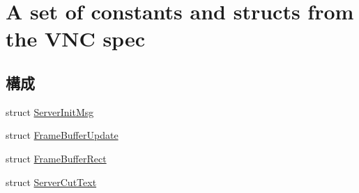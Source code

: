 \hypertarget{group__VncConstants}{
\section{A set of constants and structs from the VNC spec}
\label{group__VncConstants}
}
\subsection*{構成}
\begin{DoxyCompactItemize}
\item 
struct \hyperlink{structVncServer_1_1ServerInitMsg}{ServerInitMsg}
\item 
struct \hyperlink{structVncServer_1_1FrameBufferUpdate}{FrameBufferUpdate}
\item 
struct \hyperlink{structVncServer_1_1FrameBufferRect}{FrameBufferRect}
\item 
struct \hyperlink{structVncServer_1_1ServerCutText}{ServerCutText}
\end{DoxyCompactItemize}
